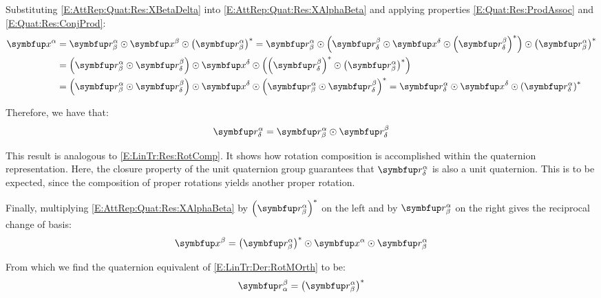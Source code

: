 Substituting \eqref{E:AttRep:Quat:Res:XBetaDelta} into \eqref{E:AttRep:Quat:Res:XAlphaBeta} and applying properties \eqref{E:Quat:Res:ProdAssoc} and \eqref{E:Quat:Res:ConjProd}:
\begin{equation} \label{E:AttRep:Quat:Res:XAlphaDelta}
\begin{split}
\qprj{x}{\alpha}  &= \RotQ{\alpha}{\beta} \qprod \qprj{x}{\beta} \qprod \qconp{\RotQ{\alpha}{\beta}}  = \RotQ{\alpha}{\beta} \qprod \left(\RotQ{\beta}{\delta} \qprod \qprj{x}{\delta} \qprod \qconp{\RotQ{\beta}{\delta}}\right) \qprod \qconp{\RotQ{\alpha}{\beta}} \\
&=\left(\RotQ{\alpha}{\beta} \qprod \RotQ{\beta}{\delta}\right) \qprod \qprj{x}{\delta} \qprod \left(\qconp{\RotQ{\beta}{\delta}} \qprod \qconp{\RotQ{\alpha}{\beta}}\right) \\
&= \left(\RotQ{\alpha}{\beta} \qprod \RotQ{\beta}{\delta}\right) \qprod \qprj{x}{\delta} \qprod \qconp{\RotQ{\alpha}{\beta} \qprod \RotQ{\beta}{\delta}} = \RotQ{\alpha}{\delta} \qprod \qprj{x}{\delta} \qprod \qconp{\RotQ{\alpha}{\delta}}
\end{split}
\end{equation}

Therefore, we have that:
\begin{equation} \label{E:AttRep:Quat:Res:RotQComp}
\RotQ{\alpha}{\delta} = \RotQ{\alpha}{\beta} \qprod \RotQ{\beta}{\delta}
\end{equation}

This result is analogous to \eqref{E:LinTr:Res:RotComp}. It shows how rotation composition is accomplished within the quaternion representation. Here, the closure property of the unit quaternion group guarantees that $\RotQ{\alpha}{\delta}$ is also a unit quaternion. This is to be expected, since the composition of proper rotations yields another proper rotation.

Finally, multiplying \eqref{E:AttRep:Quat:Res:XAlphaBeta} by $\qconp{\RotQ{\alpha}{\beta}}$ on the left and by $\RotQ{\alpha}{\beta}$ on the right gives the reciprocal change of basis:
\begin{equation} \label{E:AttRep:Quat:Res:XBetaAlpha}
\qprj{x}{\beta}   = \qconp{\RotQ{\alpha}{\beta}} \qprod \qprj{x}{\alpha} \qprod \RotQ{\alpha}{\beta}
\end{equation}

From which we find the quaternion equivalent of \eqref{E:LinTr:Der:RotMOrth} to be:
\begin{equation} \label{E:AttRep:Quat:Res:Inverse}
\RotQ{\beta}{\alpha} = \qconp{\RotQ{\alpha}{\beta}}
\end{equation}

